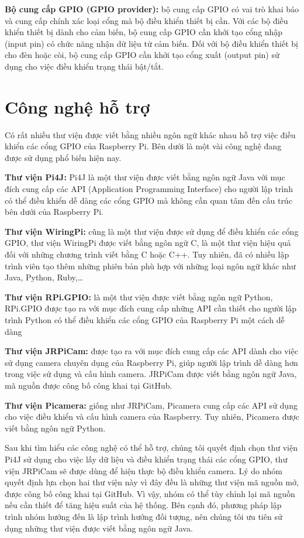 \documentclass[11pt,a4paper,oneside]{book}
\begin{document}
\textbf{Bộ cung cấp GPIO (GPIO provider):} bộ cung cấp GPIO có vai trò khai báo và cung cấp chính xác loại cổng mà bộ điều khiển thiết bị cần. Với các bộ điều khiển thiết bị dành cho cảm biến, bộ cung cấp GPIO cần khởi tạo cổng nhập (input pin) có chức năng nhận dữ liệu từ cảm biến. Đối với bộ điều khiển thiết bị cho đèn hoặc còi, bộ cung cấp GPIO cần khởi tạo cổng xuất (output pin) sử dụng cho việc điều khiển trạng thái bật/tắt.

\section{Công nghệ hỗ trợ}
Có rất nhiều thư viện được viết bằng nhiều ngôn ngữ khác nhau hỗ trợ việc điều khiển các cổng GPIO của Raspberry Pi. Bên dưới là một vài công nghệ đang được sử dụng phổ biến hiện nay.

\textbf{Thư viện Pi4J:} Pi4J là một thư viện được viết bằng ngôn ngữ Java với mục đích cung cấp các API (Application Programming Interface) cho người lập trình có thể điều khiển dễ dàng các cổng GPIO mà không cần quan tâm đến cấu trúc bên dưới của Raspberry Pi.

\textbf{Thư viện WiringPi:} cũng là một thư viện được sử dụng để điều khiển các cổng GPIO, thư viện WiringPi được viết bằng ngôn ngữ C, là một thư viện hiệu quả đối với những chương trình viết bằng C hoặc C++. Tuy nhiên, đã có nhiều lập trình viên tạo thêm những phiên bản phù hợp với những loại ngôn ngữ khác như Java, Python, Ruby,…

\textbf{Thư viện RPi.GPIO:} là một thư viện được viết bằng ngôn ngữ Python, RPi.GPIO được tạo ra với mục đích cung cấp những API cần thiết cho người lập trình Python có thể điều khiển các cổng GPIO của Raspberry Pi một cách dễ dàng

\textbf{Thư viện JRPiCam:} được tạo ra với mục đích cung cấp các API dành cho việc sử dụng camera chuyên dụng của Raspberry Pi, giúp người lập trình dễ dàng hơn trong việc sử dụng và cấu hình camera. JRPiCam được viết bằng ngôn ngữ Java, mã nguồn được công bố công khai tại GitHub.

\textbf{Thư viện Picamera:} giống như JRPiCam, Picamera cung cấp các API sử dụng cho việc điều khiển và cấu hình camera của Raspberry. Tuy nhiên, Picamera được viết bằng ngôn ngữ Python.

Sau khi tìm hiểu các công nghệ có thể hỗ trợ, chúng tôi quyết định chọn thư viện Pi4J sử dụng cho việc lấy dữ liệu và điều khiển trạng thái các cổng GPIO, thư viện JRPiCam sẽ được dùng để hiện thực bộ điều khiển camera. Lý do nhóm quyết định lựa chọn hai thư viện này vì đây đều là những thư viện mã nguồn mở, được công bố công khai tại GitHub. Vì vậy, nhóm có thể tùy chỉnh lại mã nguồn nếu cần thiết để tăng hiệu suất của hệ thống. Bên cạnh đó, phương pháp lập trình nhóm hướng đến là lập trình hướng đối tượng, nên chúng tôi ưu tiên sử dụng những thư viện được viết bằng ngôn ngữ Java.
\end{document}
